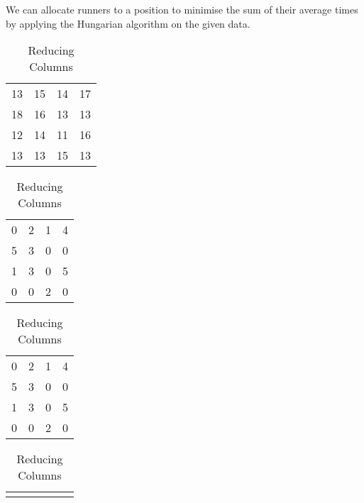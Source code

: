 \begin{subquestions}
We can allocate runners to a position to minimise the sum of their average times by applying the Hungarian algorithm on the given data.
\begin{table}[!h]
	\begin{minipage}{0.3\textwidth}
		\centering
		\begin{tabular}{cccc}
			13 & 15 & 14 & 17 \\
			18 & 16 & 13 & 13 \\
			12 & 14 & 11 & 16 \\
			13 & 13 & 15 & 13 \\
		\end{tabular}
		\captionsetup{width=1.1\linewidth}
		\caption*{Matrix From question}
	\end{minipage}
	\hspace{20pt}
	\begin{minipage}{0.3\textwidth}
		\centering
		\begin{tabular}{cccc}
			0 & 2 & 1 & 4 \\
			5 & 3 & 0 & 0 \\
			1 & 3 & 0 & 5 \\
			0 & 0 & 2 & 0 \\
		\end{tabular}
		\captionsetup{width=1.1\linewidth}
		\caption*{Reducing Rows}
	\end{minipage}
	\hspace{20pt}
	\begin{minipage}{0.3\textwidth}
		\centering
		\begin{tabular}{cccc}
			0 & 2 & 1 & 4 \\
			5 & 3 & 0 & 0 \\
			1 & 3 & 0 & 5 \\
			0 & 0 & 2 & 0 \\
		\end{tabular}
		\captionsetup{width=1.1\linewidth}
		\caption*{Reducing Columns} 
	\end{minipage}
	\vspace{20pt} 
	\begin{minipage}{0.3\textwidth}
		\centering
		\begin{tabular} {cccccc}
			&   &        &\hspace{-3.25mm} \hvs{v1}      &   &                       \\ 

\end{tabular}
\end{minipage}
\end{table}
\end{subquestions}
